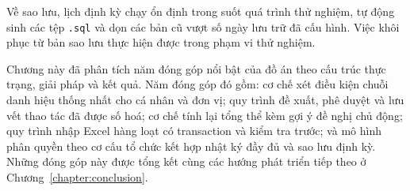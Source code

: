 \documentclass[../DoAn.tex]{subfiles}
\begin{document}
Về sao lưu, lịch định kỳ chạy ổn định trong suốt quá trình thử nghiệm, tự động sinh các tệp \texttt{.sql} và dọn các bản cũ vượt số ngày lưu trữ đã cấu hình.
Việc khôi phục từ bản sao lưu thực hiện được trong phạm vi thử nghiệm.

Chương này đã phân tích năm đóng góp nổi bật của đồ án theo cấu trúc thực trạng, giải pháp và kết quả.
Năm đóng góp đó gồm: cơ chế xét điều kiện chuỗi danh hiệu thống nhất cho cá nhân và đơn vị; quy trình đề xuất, phê duyệt và lưu vết thao tác đã được số hoá; cơ chế tính lại tổng thể kèm gợi ý đề nghị chủ động; quy trình nhập Excel hàng loạt có transaction và kiểm tra trước; và mô hình phân quyền theo cơ cấu tổ chức kết hợp nhật ký đầy đủ và sao lưu định kỳ.
Những đóng góp này được tổng kết cùng các hướng phát triển tiếp theo ở Chương~\ref{chapter:conclusion}.
\end{document}
